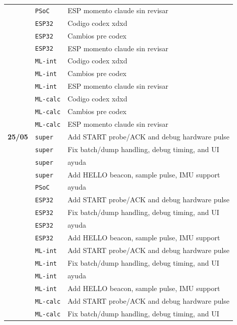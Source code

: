 \begin{longtable}{@{}p{1.7cm} p{1.5cm} p{12.2cm}@{}}
 & \texttt{\scriptsize PSoC} & ESP momento claude sin revisar \\
 & \texttt{\scriptsize ESP32} & Codigo codex xdxd \\
 & \texttt{\scriptsize ESP32} & Cambios pre codex \\
 & \texttt{\scriptsize ESP32} & ESP momento claude sin revisar \\
 & \texttt{\scriptsize ML-int} & Codigo codex xdxd \\
 & \texttt{\scriptsize ML-int} & Cambios pre codex \\
 & \texttt{\scriptsize ML-int} & ESP momento claude sin revisar \\
 & \texttt{\scriptsize ML-calc} & Codigo codex xdxd \\
 & \texttt{\scriptsize ML-calc} & Cambios pre codex \\
 & \texttt{\scriptsize ML-calc} & ESP momento claude sin revisar \\
\textbf{25/05} & \texttt{\scriptsize super} & Add START probe/ACK and debug hardware pulse \\
 & \texttt{\scriptsize super} & Fix batch/dump handling, debug timing, and UI \\
 & \texttt{\scriptsize super} & ayuda \\
 & \texttt{\scriptsize super} & Add HELLO beacon, sample pulse, IMU support \\
 & \texttt{\scriptsize PSoC} & ayuda \\
 & \texttt{\scriptsize ESP32} & Add START probe/ACK and debug hardware pulse \\
 & \texttt{\scriptsize ESP32} & Fix batch/dump handling, debug timing, and UI \\
 & \texttt{\scriptsize ESP32} & ayuda \\
 & \texttt{\scriptsize ESP32} & Add HELLO beacon, sample pulse, IMU support \\
 & \texttt{\scriptsize ML-int} & Add START probe/ACK and debug hardware pulse \\
 & \texttt{\scriptsize ML-int} & Fix batch/dump handling, debug timing, and UI \\
 & \texttt{\scriptsize ML-int} & ayuda \\
 & \texttt{\scriptsize ML-int} & Add HELLO beacon, sample pulse, IMU support \\
 & \texttt{\scriptsize ML-calc} & Add START probe/ACK and debug hardware pulse \\
 & \texttt{\scriptsize ML-calc} & Fix batch/dump handling, debug timing, and UI \\

\end{longtable}
